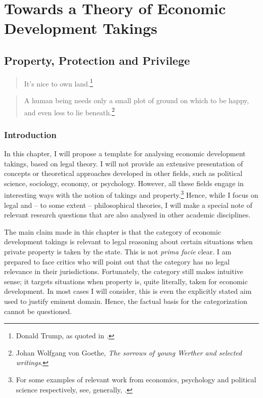 \newcommand{\isr}[1]{{#1}}

\part{Towards a Theory of Economic Development Takings}

\chapter{Property, Protection and Privilege}\label{chap:1}

\begin{quote}
It's nice to own land.\footnote{Donald Trump, as quoted in \cite{booth12}.}
\end{quote}

\begin{quote}
A human being needs only a small plot of ground on which to be happy, and even less to lie beneath.\footnote{Johan Wolfgang von Goethe, {\it The sorrows of young Werther and selected writings}.}
\end{quote}

\section{Introduction}

In this chapter, I will propose a template for analysing economic development takings, based on legal theory. I will not provide an extensive presentation of concepts or theoretical approaches developed in other fields, such as political science, sociology, economy, or psychology. However, all these fields engage in interesting ways with the notion of takings and property.\footnote{For some examples of relevant work from economics, psychology and political science respectively, see, generally, \cite{miceli11,nadler08,katz97,carruthers04}.} Hence, while I focus on legal and --  to some extent -- philosophical theories, I will make a special note of relevant research questions that are also analysed in other academic disciplines.

The main claim made in this chapter is that the category of economic development takings is relevant to legal reasoning about certain situations when private property is taken by the state. This is not {\it prima facie} clear. I am prepared to face critics who will point out that the category has no legal relevance in their jurisdictions. Fortunately, the category still makes intuitive sense; it targets situations when property is, quite literally, taken for economic development. In most cases I will consider, this is even the explicitly stated aim used to justify eminent domain. Hence, the factual basis for the categorization cannot be questioned.

